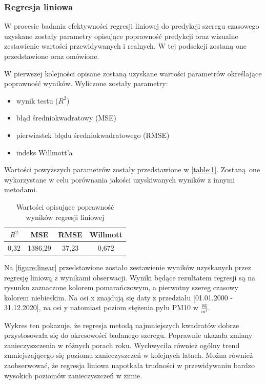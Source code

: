 \documentclass[10pt,a4paper]{article}
\begin{document}
\subsubsection{Regresja liniowa}
\label{subsection:results:linearRegression}
W procesie badania efektywności regresji liniowej do predykcji szeregu czasowego uzyskane zostały parametry opisujące poprawność predykcji oraz wizualne zestawienie wartości przewidywanych i realnych. W tej podsekcji zostaną one przedstawione oraz omówione. 

W pierwszej kolejności opisane zostaną uzyskane wartości parametrów określające poprawność wyników. Wyliczone zostały parametry:
\begin{center}
	\begin{itemize}
		\item wynik testu ($R^2$)
		\item błąd średniokwadratowy (MSE)
		\item pierwiastek błędu średniokwadratowego (RMSE)
		\item indeks Willmott'a
	\end{itemize}
\end{center}
Wartości powyższych parametrów zostały przedstawione w \autoref{table:1}. Zostaną one wykorzystane w celu porównania jakości uzyskiwanych wyników z innymi metodami.
\begin{table}[h!]
	\centering
	\begin{tabular}{|c|c|c|c|}
		\hline
		$R^2$ & MSE & RMSE & Willmott \\
		\hline
		0,32 & 1386,29 & 37,23 & 0,672 \\
		\hline
	\end{tabular}
		\caption{Wartości opisujące poprawność wyników regresji liniowej}
		\label{table:1}
\end{table}

Na \autoref{figure:linear} przedstawione zostało zestawienie wyników uzyskanych przez regresję liniową z wynikami obserwacji. Wyniki będące rezultatem regresji są na rysunku zaznaczone kolorem pomarańczowym, a pierwotny szereg czasowy kolorem niebieskim. Na osi x znajdują się daty z przedziału [01.01.2000 - 31.12.2020], na osi y natomiast poziom stężenia pyłu PM10 w $\frac{\si{\micro\gram}}{\si\meter^3}$. 

Wykres ten pokazuje, że regresja metodą najmniejszych kwadratów dobrze przystosowała się do okresowości badanego szeregu. Poprawnie ukazała zmiany zanieczyszczenia w różnych porach roku. Wychwyciła również ogólny trend zmniejszającego się poziomu zanieczyszczeń w kolejnych latach. Można również zaobserwować, że regresja liniowa napotkała trudności w przewidywaniu bardzo wysokich poziomów zanieczyszczeń w zimie. 
\end{document}
